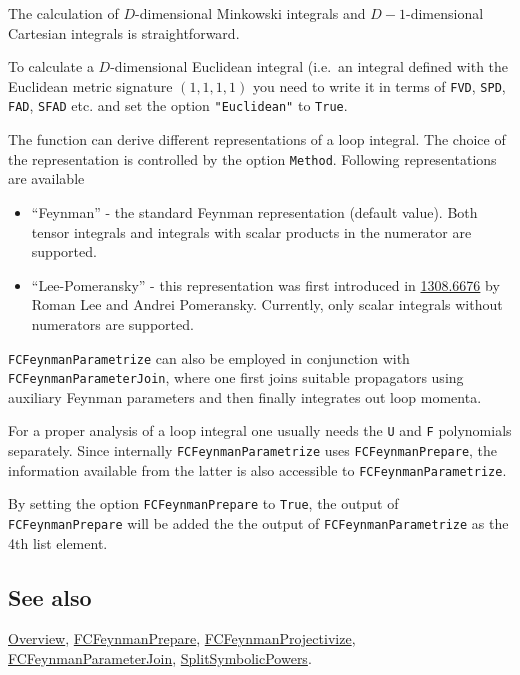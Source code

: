 \documentclass[../FeynCalcManual.tex]{subfiles}
\begin{document}
The calculation of \(D\)-dimensional Minkowski integrals and
\(D-1\)-dimensional Cartesian integrals is straightforward.

To calculate a \(D\)-dimensional Euclidean integral (i.e.~an integral
defined with the Euclidean metric signature \((1,1,1,1)\) you need to
write it in terms of \texttt{FVD}, \texttt{SPD}, \texttt{FAD},
\texttt{SFAD} etc. and set the option \texttt{"Euclidean"} to
\texttt{True}.

The function can derive different representations of a loop integral.
The choice of the representation is controlled by the option
\texttt{Method}. Following representations are available

\begin{itemize}
\tightlist
\item
  ``Feynman'' - the standard Feynman representation (default value).
  Both tensor integrals and integrals with scalar products in the
  numerator are supported.
\item
  ``Lee-Pomeransky'' - this representation was first introduced in
  \href{https://arxiv.org/abs/1308.6676}{1308.6676} by Roman Lee and
  Andrei Pomeransky. Currently, only scalar integrals without numerators
  are supported.
\end{itemize}

\texttt{FCFeynmanParametrize} can also be employed in conjunction with
\texttt{FCFeynmanParameterJoin}, where one first joins suitable
propagators using auxiliary Feynman parameters and then finally
integrates out loop momenta.

For a proper analysis of a loop integral one usually needs the
\texttt{U} and \texttt{F} polynomials separately. Since internally
\texttt{FCFeynmanParametrize} uses \texttt{FCFeynmanPrepare}, the
information available from the latter is also accessible to
\texttt{FCFeynmanParametrize}.

By setting the option \texttt{FCFeynmanPrepare} to \texttt{True}, the
output of \texttt{FCFeynmanPrepare} will be added the the output of
\texttt{FCFeynmanParametrize} as the 4th list element.

\subsection{See also}

\hyperlink{toc}{Overview},
\hyperlink{fcfeynmanprepare}{FCFeynmanPrepare},
\hyperlink{fcfeynmanprojectivize}{FCFeynmanProjectivize},
\hyperlink{fcfeynmanparameterjoin}{FCFeynmanParameterJoin},
\hyperlink{splitsymbolicpowers}{SplitSymbolicPowers}.
\end{document}
